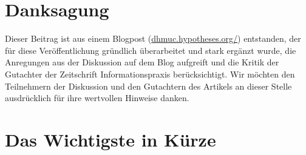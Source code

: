 \documentclass[12pt, a4paper]{article}
\begin{document}
\begin{abstract}
After a conceptual distinction from other link types, we discuss the
relation of permalinks to other digital identifiers, in particular
DOIs. We find that DOIs do not have any advantages over
permalinks. Then, we discuss the practical usage of permalinks:
Permalinks make internet sources quotable in the first place. None the
less it is in some cases unavoidable to use internet sources that do
not have a permalink. Permalinks for living documantes or databases
should always refer to particular state of the reffered object in
time. In the case of databases they should furthermore point to a
particular query or its result - rather than just a particular set of
data or the database as a whole. When shutting down a scientific
institution, care should be taken to ensure an orderly transfer of its
permalinks to a new owner.

We close with a practical example, concerning the buildup of a
publication server of the Bavarian Academy of Sciences. We have
learned that BV-numbers (i.e. the identificators of the combined
Bavarian library cataloge) cannot be used as part of a permalink,
because they may silently be removed -- for example in the course of
dublet-correction.

\begin{flushleft}
  {\bf Keywords}: permalinks, quotation of internet sources,
  digital identificator, electronic publishing, DOI
\end{flushleft}

\end{abstract}

\newpage

\tableofcontents

\onehalfspacing

\section{Danksagung}

Dieser Beitrag ist aus einem Blogpost
(\href{https://dhmuc.hypotheses.org/1179}{dhmuc.\-hypotheses\-.org/})
entstanden, der für diese Veröffentlichung gründlich
überarbeitet und stark ergänzt wurde, die Anregungen aus der
Diskussion auf dem Blog aufgreift und die Kritik der Gutachter der
Zeitschrift Informationspraxis berücksichtigt. Wir möchten den
Teilnehmern der Diskussion und den Gutachtern des Artikels an dieser
Stelle ausdrücklich für ihre wertvollen Hinweise danken.

\section{Das Wichtigste in Kürze}\label{das-wichtigste-in-kuerze}
\end{document}
